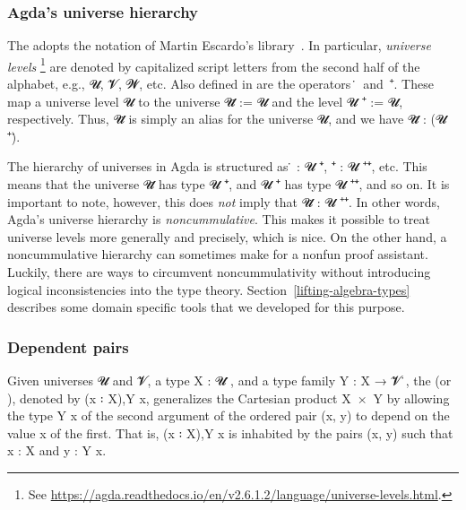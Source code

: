 \subsubsection{Agda's universe hierarchy}\label{ssec:agdas-universe-hierarchy}
The \agdaualib adopts the notation of Martin Escardo's \typetopology library~\cite{MHE}. In particular, \emph{universe levels}%
\footnote{See \url{https://agda.readthedocs.io/en/v2.6.1.2/language/universe-levels.html}.}
are denoted by capitalized script letters from the second half of the alphabet, e.g., \ab 𝓤, \ab 𝓥, \ab 𝓦, etc.  Also defined in \typetopology are the operators~\af ̇~and~\af ⁺. These map a universe level \ab 𝓤 to the universe \ab 𝓤\af ̇ := \Set \ab 𝓤 and the level \ab 𝓤 \af ⁺ \aod := \lsuc \ab 𝓤, respectively.  Thus, \ab 𝓤\af ̇ is simply an alias for the universe \Set \ab 𝓤, and we have \ab 𝓤\af ̇ \as : (\ab 𝓤 \af ⁺)\af ̇.

The hierarchy of universes in Agda is structured as \af ̇ \as : \ab 𝓤 \af ⁺\af ̇, \hskip3mm
 \af ⁺\af ̇ \as : \ab 𝓤 \af ⁺\af ⁺\af ̇, etc. This means that the universe \ab 𝓤\af ̇ has type \ab 𝓤  \af ⁺\af ̇, and 𝓤 \af ⁺\af ̇ has type \ab 𝓤 \af ⁺\af ⁺\af ̇, and so on.  It is important to note, however, this does \emph{not} imply that \ab 𝓤\af ̇ \as : \ab 𝓤 \af ⁺\af ⁺\af ̇. In other words, Agda's universe hierarchy is \emph{noncummulative}. This makes it possible to treat universe levels more generally and precisely, which is nice. On the other hand, a noncummulative hierarchy can sometimes make for a nonfun proof assistant. Luckily, there are ways to circumvent noncummulativity without introducing logical inconsistencies into the type theory. Section~\ref{lifting-algebra-types} describes some domain specific tools that we developed for this purpose.








\subsubsection{Dependent pairs}\label{ssec:dependent-pairs}
Given universes \ab 𝓤 and \ab 𝓥, a type \ab X \as : \ab 𝓤 \aof ̇, and a type family \ab Y \as : X \as → \ab 𝓥 \aof ̇, the  (or ), denoted by (\ab x \as ꞉ \ab X)\as ,\ab Y \ab x, generalizes the Cartesian product \ab X~\as ×~\ab Y by allowing the type \ab Y \ab x of the second argument of the ordered pair (\ab x\as , \ab y) to depend on the value \ab x of the first.  That is, (\ab x \as ꞉ \ab X)\as ,\ab Y \ab x is inhabited by the pairs (\ab x\as , \ab y) such that \ab x \as : \ab X and \ab y \as : \ab Y \ab x.

